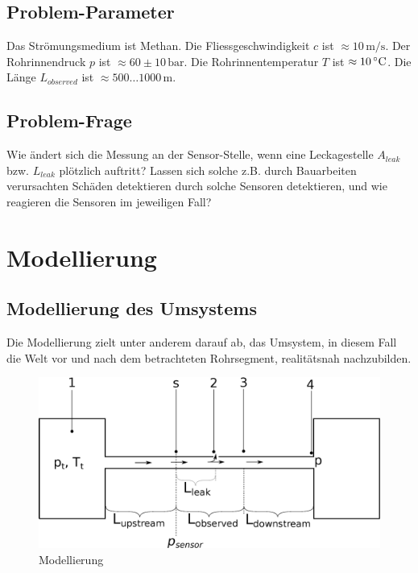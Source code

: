\documentclass[a4paper,10pt,twocolumn]{article}
\begin{document}
\subsection{Problem-Parameter}

Das Strömungsmedium ist Methan. Die Fliessgeschwindigkeit $c$ ist $\approx 10\,\mathrm{m/s}$. Der Rohrinnendruck $p$ ist $\approx 60\pm 10\,\mathrm{bar}$. Die Rohrinnentemperatur $T$ ist $\approx 10\,\mathrm{\degree C}$. Die Länge $L_\mathit{observed}$ ist $\approx 500 \ldots 1000 \,\mathrm{m}$.

\subsection{Problem-Frage}

Wie ändert sich die Messung an der Sensor-Stelle, wenn eine Leckagestelle $A_\mathit{leak}$ bzw. $L_\mathit{leak}$ plötzlich auftritt? Lassen sich solche z.B. durch Bauarbeiten verursachten Schäden detektieren durch solche Sensoren detektieren, und wie reagieren die Sensoren im jeweiligen Fall?

\section{Modellierung}

\subsection{Modellierung des Umsystems}

Die Modellierung zielt unter anderem darauf ab, das Umsystem, in diesem Fall die Welt vor und nach dem betrachteten Rohrsegment, realitätsnah nachzubilden.

\begin{figure}[hbp]
\centering
\includegraphics[width=0.9\hsize]{model.eps}
\caption{Modellierung}
\label{fig:model}
\end{figure}
\end{document}
